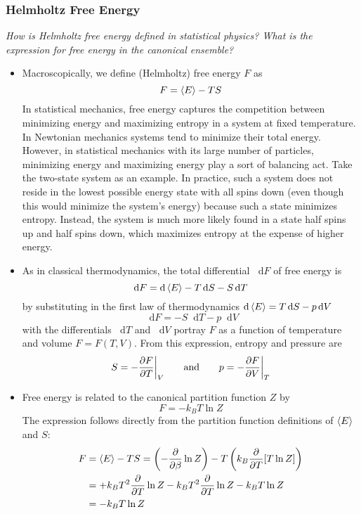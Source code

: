 \documentclass[11pt, a4paper]{article}
\newcommand{\diff}{\mathop{}\!\mathrm{d}} %
\begin{document}
\subsubsection{Helmholtz Free Energy}
\textit{How is Helmholtz free energy defined in statistical physics? What is the expression for free energy in the canonical ensemble?}
\begin{itemize}
	\item Macroscopically, we define (Helmholtz) free energy $ F $ as
	\begin{equation*}
		F = \expval{E} - TS
	\end{equation*}
	In statistical mechanics, free energy captures the competition between minimizing energy and maximizing entropy in a system at fixed temperature. In Newtonian mechanics systems tend to minimize their total energy. However, in statistical mechanics with its large number of particles, minimizing energy and maximizing energy play a sort of balancing act. Take the two-state system as an example. In practice, such a system does not reside in the lowest possible energy state with all spins down (even though this would minimize the system's energy) because such a state minimizes entropy. Instead, the system is much more likely found in a state half spins up and half spins down, which maximizes entropy at the expense of higher energy.
	
	\item As in classical thermodynamics, the total differential $ \diff F $ of free energy is
	\begin{equation*}
		\diff F = \diff \expval{E} - T \diff S - S \diff T
	\end{equation*}
	by substituting in the first law of thermodynamics $ \diff \expval{E} = T\diff S - p \diff V $
	\begin{equation*}
		\diff F = - S \diff T - p \diff V
	\end{equation*}
	with the differentials $ \diff T $ and $ \diff V $ portray $ F $ as a function of temperature and volume $ F = F(T, V) $. From this expression, entropy and pressure are 
	\begin{equation*}
		S = -\pdv{F}{T}\bigg |_{V} \qquad \text{and} \qquad p = - \pdv{F}{V}\bigg |_{T}
	\end{equation*}
	
	\item Free energy is related to the canonical partition function $ Z $ by
	\begin{equation*}
		F = - k_{B} T \ln Z
	\end{equation*}
	The expression follows directly from the partition function definitions of $ \expval{E} $ and $ S $:
	\begin{align*}
		F &= \expval{E} - TS = \left(- \pdv{}{\beta} \ln Z\right) - T \left( k_{B} \pdv{}{T}[T \ln Z]\right)\\
		&= + k_{B}T^{2}\pdv{}{T} \ln Z - k_{B}T^{2} \pdv{}{T} \ln Z - k_{B}T \ln Z\\
		&=- k_{B}T \ln Z
	\end{align*}
	
\end{itemize}
\end{document}
